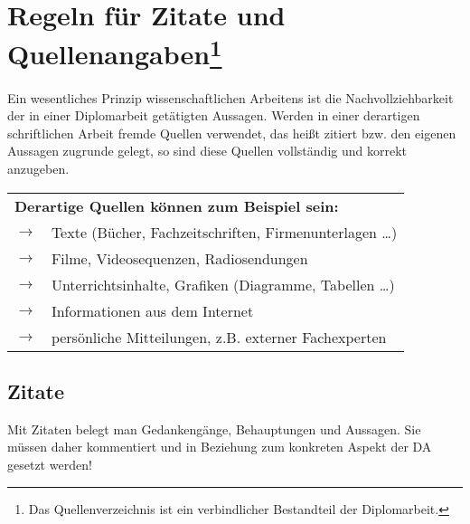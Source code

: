 \documentclass[a4paper, 12pt, xcolor=dvipsnames]{scrartcl}	%
\begin{document}
%
%
%
%
\section{Regeln für Zitate und Quellenangaben\protect\footnote{Das Quellenverzeichnis ist ein verbindlicher Bestandteil der Diplomarbeit.}}
Ein wesentliches Prinzip wissenschaftlichen Arbeitens ist die Nachvollziehbarkeit der in einer Diplomarbeit
getätigten Aussagen. Werden in einer derartigen schriftlichen Arbeit fremde Quellen verwendet, das heißt zitiert bzw. den eigenen Aussagen zugrunde gelegt, so sind diese Quellen vollständig und korrekt anzugeben.\\

{\begin{tabular}{p{1.0cm}p{12.0cm}}								%
	\multicolumn{2}{p{13.0cm}}{\textbf{Derartige Quellen können zum Beispiel sein:}} \\ 
	\textcolor{black!80} {\large\textbf{$\to$}}  & Texte (Bücher, Fachzeitschriften, Firmenunterlagen \dots) \\ 
	\textcolor{black!80} {\large\textbf{$\to$}}  & Filme, Videosequenzen, Radiosendungen \\
	\textcolor{black!80} {\large\textbf{$\to$}}  & Unterrichtsinhalte, Grafiken (Diagramme, Tabellen \dots) \\
	\textcolor{black!80} {\large\textbf{$\to$}}  & Informationen aus dem Internet \\
	\textcolor{black!80} {\large\textbf{$\to$}}  & persönliche Mitteilungen, z.B. externer Fachexperten \\ 
\end{tabular}}

\vspace{0.5cm}																	%
  

\subsection{Zitate}																%
%
\begin{Merksatz}
Mit Zitaten belegt man Gedankengänge, Behauptungen und Aussagen.
Sie müssen daher kommentiert und in Beziehung zum konkreten Aspekt der DA gesetzt
werden!
\end{Merksatz}
%
\end{document}
